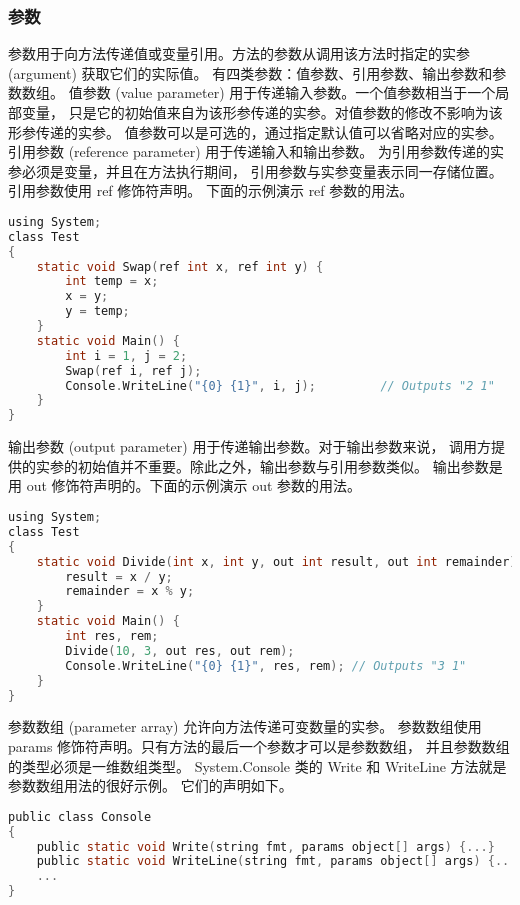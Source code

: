 \subsubsection{参数}
参数用于向方法传递值或变量引用。方法的参数从调用该方法时指定的实参 (argument) 获取它们的实际值。
有四类参数：值参数、引用参数、输出参数和参数数组。
值参数 (value parameter) 用于传递输入参数。一个值参数相当于一个局部变量，
只是它的初始值来自为该形参传递的实参。对值参数的修改不影响为该形参传递的实参。
值参数可以是可选的，通过指定默认值可以省略对应的实参。
引用参数 (reference parameter) 用于传递输入和输出参数。
为引用参数传递的实参必须是变量，并且在方法执行期间，
引用参数与实参变量表示同一存储位置。引用参数使用 ref 修饰符声明。
下面的示例演示 ref 参数的用法。

 \begin{lstlisting}[language=C] 
using System;
class Test
{
    static void Swap(ref int x, ref int y) {
        int temp = x;
        x = y;
        y = temp;
    }
    static void Main() {
        int i = 1, j = 2;
        Swap(ref i, ref j);
        Console.WriteLine("{0} {1}", i, j);         // Outputs "2 1"
    }
}
 \end{lstlisting}

输出参数 (output parameter) 用于传递输出参数。对于输出参数来说，
调用方提供的实参的初始值并不重要。除此之外，输出参数与引用参数类似。
输出参数是用 out 修饰符声明的。下面的示例演示 out 参数的用法。

 \begin{lstlisting}[language=C] 
using System;
class Test
{
    static void Divide(int x, int y, out int result, out int remainder) {
        result = x / y;
        remainder = x % y;
    }
    static void Main() {
        int res, rem;
        Divide(10, 3, out res, out rem);
        Console.WriteLine("{0} {1}", res, rem); // Outputs "3 1"
    }
}
 \end{lstlisting}

参数数组 (parameter array) 允许向方法传递可变数量的实参。
参数数组使用 params 修饰符声明。只有方法的最后一个参数才可以是参数数组，
并且参数数组的类型必须是一维数组类型。
System.Console 类的 Write 和 WriteLine 方法就是参数数组用法的很好示例。
它们的声明如下。

 \begin{lstlisting}[language=C] 
public class Console
{
    public static void Write(string fmt, params object[] args) {...}
    public static void WriteLine(string fmt, params object[] args) {...}
    ...
}
 \end{lstlisting}

